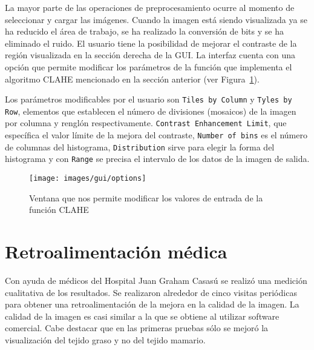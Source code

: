La mayor parte de las operaciones de preprocesamiento ocurre al momento de
seleccionar y cargar las imágenes. Cuando la imagen está siendo visualizada ya
se ha reducido el área de trabajo, se ha realizado la conversión de bits y se
ha eliminado el ruido. El usuario tiene la posibilidad de mejorar el contraste
de la región visualizada en la sección derecha de la GUI. La interfaz cuenta
con una opción que permite modificar los parámetros de la función que
implementa el algoritmo CLAHE mencionado en la sección anterior (ver
Figura~\ref{options}). 

Los parámetros modificables por el usuario son \texttt{Tiles by Column} y
\texttt{Tyles by Row}, elementos que establecen el número de divisiones
(mosaicos) de la imagen por columna y renglón respectivamente. \texttt{Contrast
Enhancement Limit}, que específica el valor límite de la mejora del contraste,
\texttt{Number of bins} es el número de columnas del histograma,
\texttt{Distribution} sirve para elegir la forma del histograma y con
\texttt{Range} se precisa el intervalo de los datos de la imagen de salida.

\begin{figure}[h]
  \begin{center}
    {\texttt{[image: images/gui/options]}}
  \end{center}
  \caption[GUI: Modificación de parámetros]
  {Ventana que nos permite modificar los valores de entrada de la función CLAHE} 
  \label{options} 
\end{figure}

\section{Retroalimentación médica}

Con ayuda de médicos del Hospital Juan Graham Casasú se realizó una medición
cualitativa de los resultados. Se realizaron alrededor de cinco visitas
periódicas para obtener una retroalimentación de la mejora en la calidad de la
imagen. La calidad de la imagen es casi similar a la que se obtiene al utilizar
software comercial. Cabe destacar que en las primeras pruebas sólo se mejoró la
visualización del tejido graso y no del tejido mamario.



